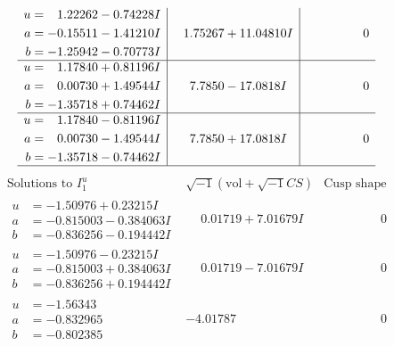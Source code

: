 \documentclass[1p]{elsarticle_modified}
\theoremstyle{definition}
\newcommand{\I}{\sqrt{-1}}
\begin{document}
$$\begin{array}{c|c|c}
\begin{aligned}
u &= \phantom{-}1.22262 - 0.74228 I \\
a &= -0.15511 - 1.41210 I \\
b &= -1.25942 - 0.70773 I\end{aligned}
 & \phantom{-}1.75267 + 11.04810 I & \phantom{-0.000000 } 0 \\ \hline\begin{aligned}
u &= \phantom{-}1.17840 + 0.81196 I \\
a &= \phantom{-}0.00730 + 1.49544 I \\
b &= -1.35718 + 0.74462 I\end{aligned}
 & \phantom{-}7.7850 - 17.0818 I & \phantom{-0.000000 } 0 \\ \hline\begin{aligned}
u &= \phantom{-}1.17840 - 0.81196 I \\
a &= \phantom{-}0.00730 - 1.49544 I \\
b &= -1.35718 - 0.74462 I\end{aligned}
 & \phantom{-}7.7850 + 17.0818 I & \phantom{-0.000000 } 0\\
 \hline 
 \end{array}$$\newpage$$\begin{array}{c|c|c}  
\text{Solutions to }I^u_{1}& \I (\text{vol} + \sqrt{-1}CS) & \text{Cusp shape}\\
 \hline 
\begin{aligned}
u &= -1.50976 + 0.23215 I \\
a &= -0.815003 - 0.384063 I \\
b &= -0.836256 - 0.194442 I\end{aligned}
 & \phantom{-}0.01719 + 7.01679 I & \phantom{-0.000000 } 0 \\ \hline\begin{aligned}
u &= -1.50976 - 0.23215 I \\
a &= -0.815003 + 0.384063 I \\
b &= -0.836256 + 0.194442 I\end{aligned}
 & \phantom{-}0.01719 - 7.01679 I & \phantom{-0.000000 } 0 \\ \hline\begin{aligned}
u &= -1.56343\phantom{ +0.000000I} \\
a &= -0.832965\phantom{ +0.000000I} \\
b &= -0.802385\phantom{ +0.000000I}\end{aligned}
 & -4.01787\phantom{ +0.000000I} & \phantom{-0.000000 } 0 \\ \hline\begin{aligned}

\end{aligned}
\end{array}$$
\end{document}
